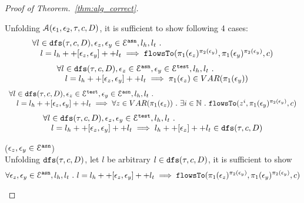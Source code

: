 \begin{proof}[Proof of Theorem.~\ref{thm:alg_correct}]
\begin{case}
Unfolding $\mathcal{A}(\mathtt{\epsilon}_1, \mathtt{\epsilon}_2, \mathtt{\tau}, c, D)$, it is sufficient to show following 4 cases:
\begin{equation}
\begin{array}{l}
   \forall l \in \mathtt{dfs}(\mathtt{\tau}, c, D), \mathtt{\epsilon}_z, \mathtt{\epsilon}_y \in \mathcal{E}^{\mathtt{{asn}}}, l_h, l_t ~.~ 
   \\ \quad 
   l = l_h ++ [\mathtt{\epsilon}_z, \mathtt{\epsilon}_y] ++ l_t 
   \implies \mathtt{flowsTo}(\pi_1(\mathtt{\epsilon}_z)^{\pi_2(\mathtt{\epsilon}_y)}, \pi_1(\mathtt{\epsilon}_y)^{\pi_2(\mathtt{\epsilon}_y)}, c)
\end{array}
\end{equation}
%
\begin{equation}
\begin{array}{l}
  \forall l \in \mathtt{dfs}(\mathtt{\tau}, c, D), \mathtt{\epsilon}_z \in \mathcal{E}^{\mathtt{{asn}}}, \mathtt{\epsilon}_y \in \mathcal{E}^{\mathtt{{test}}}, l_h, l_t ~.~
   \\ \quad 
   l = l_h ++ [\mathtt{\epsilon}_z, \mathtt{\epsilon}_y] ++ l_t 
  \implies \pi_1(\mathtt{\epsilon}_z) \in VAR(\pi_1(\mathtt{\epsilon}_y))
\end{array}
\end{equation}
%
\begin{equation}
\begin{array}{l}
  \forall l \in \mathtt{dfs}(\mathtt{\tau}, c, D), \mathtt{\epsilon}_z \in \mathcal{E}^{\mathtt{{test}}}, \mathtt{\epsilon}_y \in \mathcal{E}^{\mathtt{{asn}}}, l_h, l_t ~.~
   \\ \quad 
   l = l_h ++ [\mathtt{\epsilon}_z, \mathtt{\epsilon}_y] ++ l_t 
  \implies \forall z \in VAR(\pi_1(\mathtt{\epsilon}_z)) ~.~ \exists i \in\mathbb{N} ~.~
  \mathtt{flowsTo}(z^i, \pi_1(\mathtt{\epsilon}_y)^{\pi_2(\mathtt{\epsilon}_y)}, c)
\end{array}
\end{equation}
%
\begin{equation}
\begin{array}{l}
  \forall l \in \mathtt{dfs}(\mathtt{\tau}, c, D), \mathtt{\epsilon}_z, \mathtt{\epsilon}_y \in \mathcal{E}^{\mathtt{{test}}}, l_h, l_t ~.~
   \\ \quad 
   l = l_h ++ [\mathtt{\epsilon}_z, \mathtt{\epsilon}_y] ++ l_t 
  \implies l_h ++ [\mathtt{\epsilon}_z] ++ l_t \in \mathtt{dfs}(\mathtt{\tau}, c, D)
\end{array}
\end{equation}
%
\begin{subcase}($\mathtt{\epsilon}_z, \mathtt{\epsilon}_y \in \mathcal{E}^{\mathtt{{asn}}}$)
\\
Unfolding $\mathtt{dfs}(\mathtt{\tau}, c, D)$, let $l$ be arbitrary $l \in  \mathtt{dfs}(\mathtt{\tau}, c, D)$, it is sufficient to show 
\[
   \forall \mathtt{\epsilon}_z, \mathtt{\epsilon}_y \in \mathcal{E}^{\mathtt{{asn}}}, l_h, l_t ~.~ 
   l = l_h ++ [\mathtt{\epsilon}_z, \mathtt{\epsilon}_y] ++ l_t 
   \implies \mathtt{flowsTo}(\pi_1(\mathtt{\epsilon}_z)^{\pi_2(\mathtt{\epsilon}_y)}, \pi_1(\mathtt{\epsilon}_y)^{\pi_2(\mathtt{\epsilon}_y)}, c)
\]
\end{subcase}
\end{case}
\end{proof}

